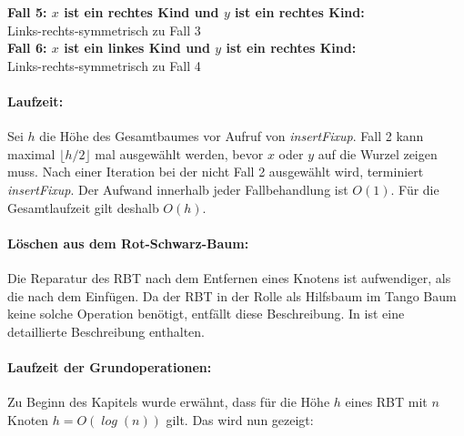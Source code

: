 \documentclass[a4paper,12pt]{article}
\begin{document}
\noindent\textbf{Fall 5: $x$ ist ein rechtes Kind und $y$ ist ein rechtes Kind: }\\ 
Links-rechts-symmetrisch zu Fall 3\\
\noindent\textbf{Fall 6: $x$ ist ein linkes Kind und $y$ ist ein rechtes Kind: }\\ 
Links-rechts-symmetrisch zu Fall 4\\


\paragraph{Laufzeit:}
\noindent  Sei $h$ die Höhe des Gesamtbaumes vor Aufruf von \textit{insertFixup}. Fall 2 kann maximal $\lfloor h / 2\rfloor$ mal ausgewählt werden, bevor $x$ oder $y$ auf die Wurzel zeigen muss. Nach einer Iteration bei der nicht Fall 2 ausgewählt wird, terminiert \textit{insertFixup}. Der Aufwand innerhalb jeder Fallbehandlung ist $O(1)$. Für die Gesamtlaufzeit gilt deshalb $\mathit{O(h)}$.


  
\paragraph{Löschen aus dem Rot-Schwarz-Baum:}
Die Reparatur des RBT nach dem Entfernen eines Knotens ist aufwendiger, als die nach dem Einfügen. Da der RBT in der Rolle als Hilfsbaum im Tango Baum keine solche Operation benötigt, entfällt diese Beschreibung. In \cite{algEinf} ist eine detaillierte Beschreibung enthalten. 
\paragraph{Laufzeit der Grundoperationen:}
Zu Beginn des Kapitels wurde erwähnt, dass für die Höhe $h$ eines RBT mit $n$ Knoten $h = \mathit{O(\log {\left(n\right)})}$  gilt. Das wird nun gezeigt:
\end{document}
